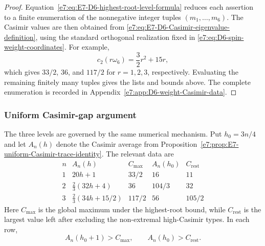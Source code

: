 \documentclass[11pt,reqno]{amsart}
\theoremstyle{definition}
\theoremstyle{remark}
\begin{document}
\begin{proof}
Equation~\eqref{e7:eq:E7-D6-highest-root-level-formula} reduces each assertion
to a finite enumeration of the nonnegative integer tuples
\((m_1,\ldots,m_6)\).  The Casimir values are then obtained from
\eqref{e7:eq:E7-D6-Casimir-eigenvalue-definition}, using the standard
orthogonal realization fixed in
\eqref{e7:eq:D6-spin-weight-coordinates}.  For example,
\begin{equation*}
  c_2(r\omega_6)
  =\frac32r^2+15r,
\end{equation*}
which gives \(33/2\), \(36\), and \(117/2\) for \(r=1,2,3\),
respectively.  Evaluating the remaining finitely many tuples gives the
lists and bounds above.  The complete enumeration is recorded in
Appendix~\ref{e7:app:D6-weight-Casimir-data}.
\end{proof}

\subsubsection{Uniform Casimir-gap argument}


The three levels are governed by the same numerical mechanism.  Put
$h_0=3n/4$ and let $A_n(h)$ denote the Casimir average from
Proposition~\ref{e7:prop:E7-uniform-Casimir-trace-identity}.  The relevant
data are
\begin{equation*}
\begin{array}{c|c|c|c|c}
 n&A_n(h)&C_{\max}&A_n(h_0)&C_{\mathrm{rest}}\\ \hline
 1&20h+1&33/2&16&11\\[1mm]
 2&\frac23(32h+4)&36&104/3&32\\[1mm]
 3&\frac23(34h+15/2)&117/2&56&105/2
\end{array}
\end{equation*}
Here $C_{\max}$ is the global maximum under the highest-root bound, while
$C_{\mathrm{rest}}$ is the largest value left after excluding the
non-extremal high-Casimir types.  In each row,
\begin{equation}
 A_n(h_0+1)>C_{\max},
 \qquad
 A_n(h_0)>C_{\mathrm{rest}}.
 \label{e7:eq:E7-two-uniform-Casimir-gaps}
\end{equation}
\end{document}
